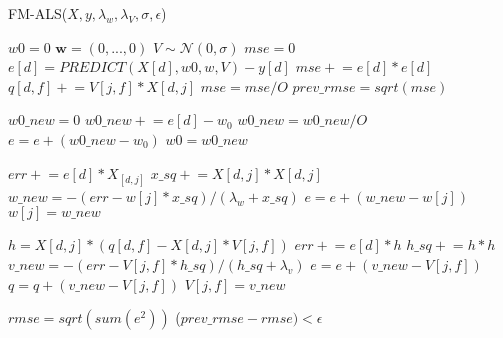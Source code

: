 \documentclass[10pt]{journal}
\newcommand{\pluseq}{\mathrel{+}=}
\begin{document}
\begin{algorithm}
  \caption{FM-ALS($X, y, \lambda_w, \lambda_V, \sigma, \epsilon$)}
  \label{alg:fm-als}
  \begin{algorithmic}[1]
    \State $w0 = 0$  
    \State $\bm{w} = (0, ..., 0)$
    \State $V \sim \mathcal{N}(0, \sigma)$
    \State $mse = 0$
      
        \State $e[d] = PREDICT(X[d], w0, w, V) - y[d]$
        \State $mse \pluseq e[d] * e[d]$
                \State $q[d, f] \pluseq V[j,f] * X[d,j]$
            \EndFor
        \EndFor
    \EndFor
    \State $mse = mse / O$
    \State $prev\_rmse = sqrt(mse)$
    \item[]
    \Repeat  {}
        \State $w0\_new = 0$  
            \State $w0\_new \pluseq e[d] - w_0$
        \EndFor
        \State $w0\_new = w0\_new / O$
        \State $e = e + (w0\_new - w_0)$
        \State $w0 = w0\_new$
        \item[]
          
                \State $err \pluseq e[d] * X_[d,j]$
                \State $x\_sq \pluseq X[d,j] * X[d,j]$
            \EndFor
            \State $w\_new = - (err - w[j] * x\_sq) / (\lambda_w + x\_sq)$
            \State $e = e + (w\_new - w[j])$
            \State $w[j] = w\_new$
        \EndFor
        \item[]
          
                    \State $h = X[d,j] * (q[d,f] - X[d,j] * V[j,f])$
                    \State $err \pluseq e[d] * h$
                    \State $h\_sq \pluseq h * h$
                \EndFor
                \State $v\_new = - (err - V[j,f] * h\_sq) / (h\_sq + \lambda_v)$
                \State $e = e + (v\_new - V[j, f])$
                \State $q = q + (v\_new - V[j, f])$
                \State $V[j,f] = v\_new$
            \EndFor
        \EndFor
        \item[]
        \State $rmse = sqrt(sum(e^2))$  
    \Until ($prev\_rmse - rmse) < \epsilon$
  \end{algorithmic}
\end{algorithm}
\end{document}
